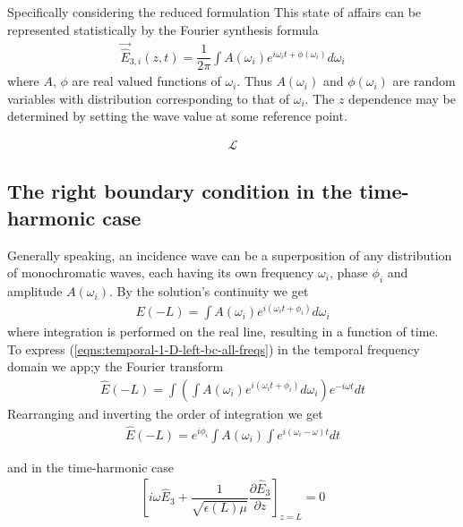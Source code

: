 \documentclass[12pt,twoside]{report}
\begin{document}
Specifically considering the reduced formulation This state of affairs can be represented statistically by the Fourier synthesis formula
\begin{align}
\overrightarrow{\hat{E}}_{3,i}(z,t) = \dfrac{1}{2\pi}\int	A(\omega_i) e^{i \omega_i t+\phi(\omega_i)} d\omega_i
\end{align} 
where $A$, $\phi$ are real valued functions of $\omega_i$. Thus $A(\omega_i)$ and $\phi(\omega_i)$ are random variables with distribution corresponding to that of $\omega_i$.  The $z$ dependence may be determined by setting the wave value at some reference point. 

\begin{align}
\mathcal{L}
\end{align}
\subsection{The right boundary condition in the time-harmonic case}
Generally speaking, an incidence wave can be a superposition of any distribution of monochromatic waves, each having its own frequency $\omega_i$, phase $\phi_i$ and amplitude $A(\omega_i)$. By the solution's continuity we get
\begin{align}
\label{eqns:temporal-1-D-left-bc-all-freqs}
E(-L) = \int A(\omega_i)e^{i(\omega_i t+\phi_i)}d \omega_i
\end{align}
where integration is performed on the real line, resulting in a function of time. \\
To express (\ref{eqns:temporal-1-D-left-bc-all-freqs}) in the temporal frequency domain we app;y the Fourier transform 
\begin{align*}
\hat{E}(-L) = \int\left(\int A(\omega_i)e^{i(\omega_i t+\phi_i)}d \omega_i\right) e^{-i \omega t}dt
\end{align*} 
Rearranging and inverting the order of integration we get
\begin{align}
\hat{E}(-L) = e^{i \phi_i}\int A(\omega_i) \int e^{i(\omega_i - \omega)t} dt
\end{align}


 
and in the time-harmonic case
\begin{align}
\label{eqns:1_D-time-harmonic-traveling-wave-bc}
\left[ i \omega \hat{E}_3 + \dfrac{1}{\sqrt{\epsilon(L)\mu}} \dfrac{\partial \hat{E}_3}{\partial z} \right]_{z = L}=0
\end{align}
  
\end{document}
